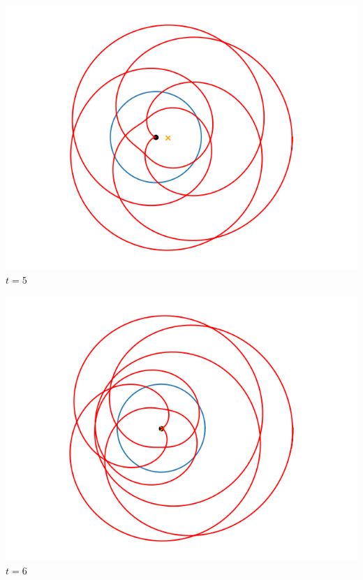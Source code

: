 \documentclass[11pt,class=report,crop=false]{standalone}
\begin{document}
\begin{center}
	\begin{minipage}{0.3\textwidth}
	\center \includegraphics[scale=\myscale,scale=0.33]{figures/fourier-9-5}
	$t = 5$ 
	\end{minipage}
	\begin{minipage}{0.3\textwidth}
	\center \includegraphics[scale=\myscale,scale=0.33]{figures/fourier-9-6}
	$t = 6$ 
	\end{minipage}
	\begin{minipage}{0.3\textwidth}

\end{minipage}
\end{center}
\end{document}
